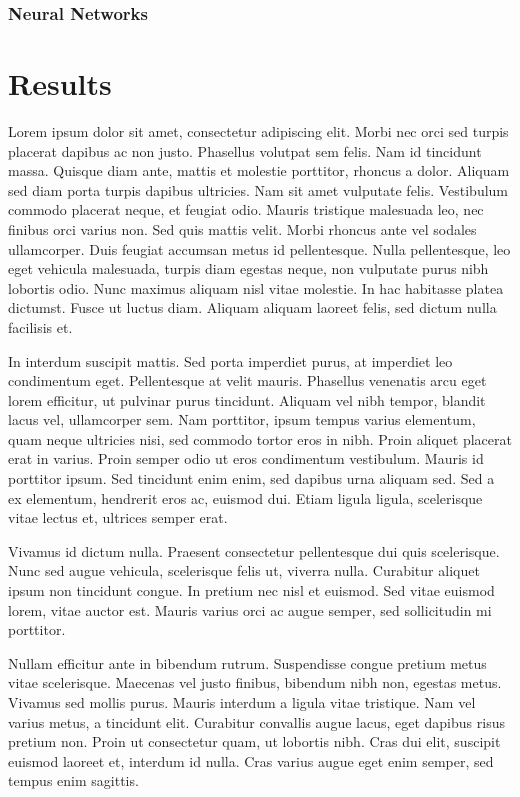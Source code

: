 \documentclass[conference]{IEEEtran}
\begin{document}
\subsubsection{Neural Networks}

\section{Results}

Lorem ipsum dolor sit amet, consectetur adipiscing elit. Morbi nec orci sed turpis placerat dapibus ac non justo. Phasellus volutpat sem felis. Nam id tincidunt massa. Quisque diam ante, mattis et molestie porttitor, rhoncus a dolor. Aliquam sed diam porta turpis dapibus ultricies. Nam sit amet vulputate felis. Vestibulum commodo placerat neque, et feugiat odio. Mauris tristique malesuada leo, nec finibus orci varius non. Sed quis mattis velit. Morbi rhoncus ante vel sodales ullamcorper. Duis feugiat accumsan metus id pellentesque. Nulla pellentesque, leo eget vehicula malesuada, turpis diam egestas neque, non vulputate purus nibh lobortis odio. Nunc maximus aliquam nisl vitae molestie. In hac habitasse platea dictumst. Fusce ut luctus diam. Aliquam aliquam laoreet felis, sed dictum nulla facilisis et.

In interdum suscipit mattis. Sed porta imperdiet purus, at imperdiet leo condimentum eget. Pellentesque at velit mauris. Phasellus venenatis arcu eget lorem efficitur, ut pulvinar purus tincidunt. Aliquam vel nibh tempor, blandit lacus vel, ullamcorper sem. Nam porttitor, ipsum tempus varius elementum, quam neque ultricies nisi, sed commodo tortor eros in nibh. Proin aliquet placerat erat in varius. Proin semper odio ut eros condimentum vestibulum. Mauris id porttitor ipsum. Sed tincidunt enim enim, sed dapibus urna aliquam sed. Sed a ex elementum, hendrerit eros ac, euismod dui. Etiam ligula ligula, scelerisque vitae lectus et, ultrices semper erat.

Vivamus id dictum nulla. Praesent consectetur pellentesque dui quis scelerisque. Nunc sed augue vehicula, scelerisque felis ut, viverra nulla. Curabitur aliquet ipsum non tincidunt congue. In pretium nec nisl et euismod. Sed vitae euismod lorem, vitae auctor est. Mauris varius orci ac augue semper, sed sollicitudin mi porttitor.

Nullam efficitur ante in bibendum rutrum. Suspendisse congue pretium metus vitae scelerisque. Maecenas vel justo finibus, bibendum nibh non, egestas metus. Vivamus sed mollis purus. Mauris interdum a ligula vitae tristique. Nam vel varius metus, a tincidunt elit. Curabitur convallis augue lacus, eget dapibus risus pretium non. Proin ut consectetur quam, ut lobortis nibh. Cras dui elit, suscipit euismod laoreet et, interdum id nulla. Cras varius augue eget enim semper, sed tempus enim sagittis.
\end{document}
